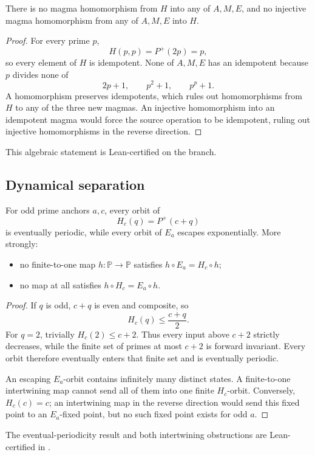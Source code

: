 \documentclass[10pt,a4paper]{scrartcl}
\newcommand{\PP}{\mathbb P}
\begin{document}
There is no magma homomorphism from $H$ into any of $A,M,E$, and no injective magma homomorphism from any of $A,M,E$ into $H$.

\begin{proof}
For every prime $p$,
\[
H(p,p)=P^+(2p)=p,
\]
so every element of $H$ is idempotent. None of $A,M,E$ has an idempotent because $p$ divides none of
\[
2p+1,\qquad p^2+1,\qquad p^p+1.
\]
A homomorphism preserves idempotents, which rules out homomorphisms from $H$ to any of the three new magmas. An injective homomorphism into an idempotent magma would force the source operation to be idempotent, ruling out injective homomorphisms in the reverse direction.
\end{proof}

This algebraic statement is Lean-certified on the branch.

\subsection{Dynamical separation}

For odd prime anchors $a,c$, every orbit of
\[
H_c(q)=P^+(c+q)
\]
is eventually periodic, while every orbit of $E_a$ escapes exponentially. More strongly:
\begin{itemize}
  \item no finite-to-one map $h:\PP\to\PP$ satisfies $h\circ E_a=H_c\circ h$;
  \item no map at all satisfies $h\circ H_c=E_a\circ h$.
\end{itemize}

\begin{proof}
If $q$ is odd, $c+q$ is even and composite, so
\[
H_c(q)\le\frac{c+q}{2}.
\]
For $q=2$, trivially $H_c(2)\le c+2$. Thus every input above $c+2$ strictly decreases, while the finite set of primes at most $c+2$ is forward invariant. Every orbit therefore eventually enters that finite set and is eventually periodic.

An escaping $E_a$-orbit contains infinitely many distinct states. A finite-to-one intertwining map cannot send all of them into one finite $H_c$-orbit. Conversely, $H_c(c)=c$; an intertwining map in the reverse direction would send this fixed point to an $E_a$-fixed point, but no such fixed point exists for odd $a$.
\end{proof}

The eventual-periodicity result and both intertwining obstructions are Lean-certified in .
\end{document}

